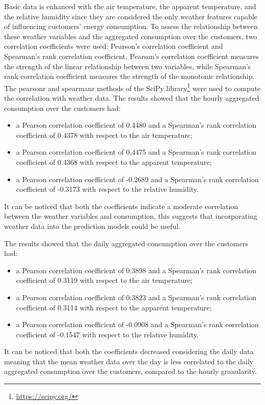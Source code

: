 Basic data is enhanced with the air temperature, the apparent temperature, and the relative humidity since they are considered the only weather features capable of influencing customers' energy consumption.
To assess the relationship between these weather variables and the aggregated consumption over the customers, two correlation coefficients were used: Pearson's correlation coefficient and Spearman's rank correlation coefficient.
Pearson's correlation coefficient measures the strength of the linear relationship between two variables, while Spearman's rank correlation coefficient measures the strength of the monotonic relationship.
The pearsonr and spearmanr methods of the SciPy library\footnote{ \url{https://scipy.org/} } were used to compute the correlation with weather data.
The results showed that the hourly aggregated consumption over the customers had:
\begin{itemize}
  \item a Pearson correlation coefficient of 0.4480 and a Spearman's rank correlation coefficient of 0.4378 with respect to the air temperature;
  \item a Pearson correlation coefficient of 0.4475 and a Spearman's rank correlation coefficient of 0.4368 with respect to the apparent temperature;
  \item a Pearson correlation coefficient of -0.2689 and a Spearman's rank correlation coefficient of -0.3173 with respect to the relative humidity.
\end{itemize}
It can be noticed that both the coefficients indicate a moderate correlation between the weather variables and consumption, this suggests that incorporating weather data into the prediction models could be useful.

The results showed that the daily aggregated consumption over the customers had:
\begin{itemize}
  \item a Pearson correlation coefficient of 0.3898 and a Spearman's rank correlation coefficient of 0.3119 with respect to the air temperature;
  \item a Pearson correlation coefficient of 0.3823 and a Spearman's rank correlation coefficient of 0.3114 with respect to the apparent temperature;
  \item a Pearson correlation coefficient of -0.0908 and a Spearman's rank correlation coefficient of -0.1547 with respect to the relative humidity.
\end{itemize}
It can be noticed that both the coefficients decreased considering the daily data meaning that the mean weather data over the day is less correlated to the daily aggregated consumption over the customers, compared to the hourly granularity.



